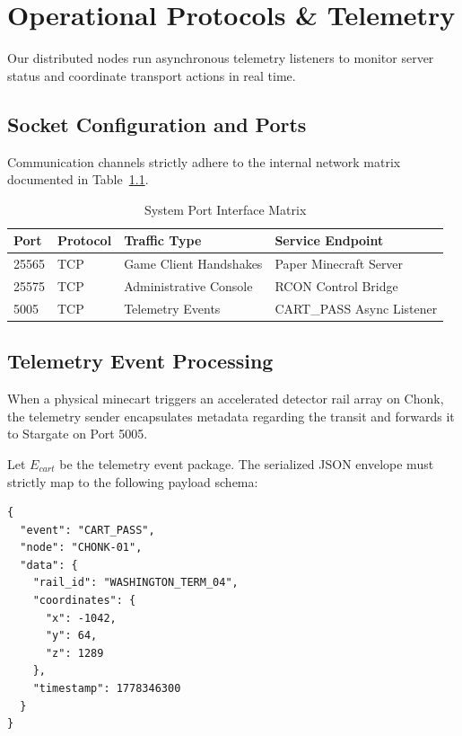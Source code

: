 \chapter{Operational Protocols \& Telemetry}

Our distributed nodes run asynchronous telemetry listeners to monitor server status and coordinate transport actions in real time.

\section{Socket Configuration and Ports}
Communication channels strictly adhere to the internal network matrix documented in Table~\ref{tab:port_map}.

\begin{table}[htbp]
\centering
\caption{System Port Interface Matrix}
\label{tab:port_map}
\begin{tabular}{llll}
\toprule
\textbf{Port} & \textbf{Protocol} & \textbf{Traffic Type} & \textbf{Service Endpoint} \\ 
\midrule
25565 & TCP & Game Client Handshakes & Paper Minecraft Server \\
25575 & TCP & Administrative Console & RCON Control Bridge \\
5005  & TCP & Telemetry Events       & CART\_PASS Async Listener \\
\bottomrule
\end{tabular}
\end{table}

\section{Telemetry Event Processing}
When a physical minecart triggers an accelerated detector rail array on Chonk, the telemetry sender encapsulates metadata regarding the transit and forwards it to Stargate on Port 5005.

Let $E_{cart}$ be the telemetry event package. The serialized JSON envelope must strictly map to the following payload schema:

\begin{lstlisting}[style=bashstyle, caption={CART\_PASS Telemetry JSON Schema}]
{
  "event": "CART_PASS",
  "node": "CHONK-01",
  "data": {
    "rail_id": "WASHINGTON_TERM_04",
    "coordinates": {
      "x": -1042,
      "y": 64,
      "z": 1289
    },
    "timestamp": 1778346300
  }
}
\end{lstlisting}

